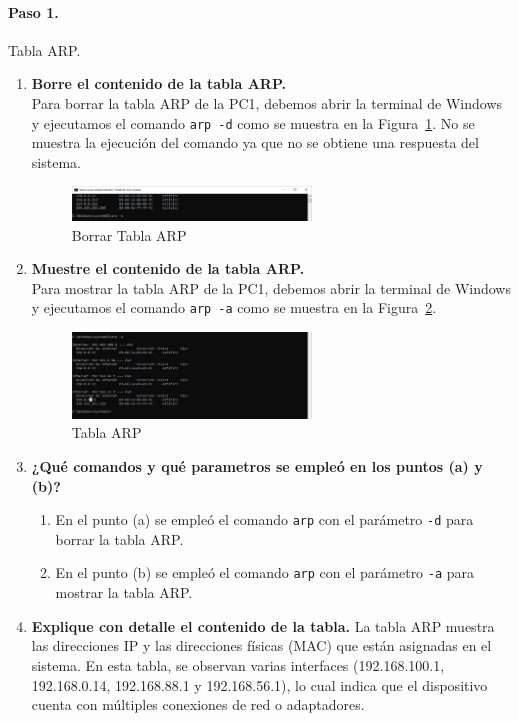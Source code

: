         \paragraph{Paso 1.}
        Tabla ARP.
        \begin{enumerate}
            \item \textbf{Borre el contenido de la tabla ARP.}\\
            Para borrar la tabla ARP de la PC1, debemos abrir la terminal de Windows y ejecutamos el comando \texttt{arp -d} como se muestra en la Figura~\ref{fig:borrar_arp}. No se muestra la ejecución del comando ya que no se obtiene una respuesta del sistema.
            \begin{figure}[H]
                \centering
                \includegraphics[width=0.6\textwidth]{img/borrar_tabla_ARP.PNG}
                \caption{Borrar Tabla ARP}
                \label{fig:borrar_arp}
            \end{figure}
            \item \textbf{Muestre el contenido de la tabla ARP.}\\
            Para mostrar la tabla ARP de la PC1, debemos abrir la terminal de Windows y ejecutamos el comando \texttt{arp -a} como se muestra en la Figura~\ref{fig:tabla_arp}.
            \begin{figure}[H]
                \centering
                \includegraphics[width=0.6\textwidth]{img/tabla_ARP.PNG}
                \caption{Tabla ARP}
                \label{fig:tabla_arp}
            \end{figure}
            \item \textbf{¿Qué comandos y qué parametros se empleó en los puntos (a) y (b)?}
            \begin{enumerate}
                \item En el punto (a) se empleó el comando \texttt{arp} con el parámetro \texttt{-d} para borrar la tabla ARP. 
                \item En el punto (b) se empleó el comando \texttt{arp} con el parámetro \texttt{-a} para mostrar la tabla ARP.
            \end{enumerate}
            \item \textbf{Explique con detalle el contenido de la tabla.}
            La tabla ARP muestra las direcciones IP y las direcciones físicas (MAC) que están asignadas en el sistema. En esta tabla, se observan varias interfaces (192.168.100.1, 192.168.0.14, 192.168.88.1 y 192.168.56.1), lo cual indica que el dispositivo cuenta con múltiples conexiones de red o adaptadores.
            

\end{enumerate}
